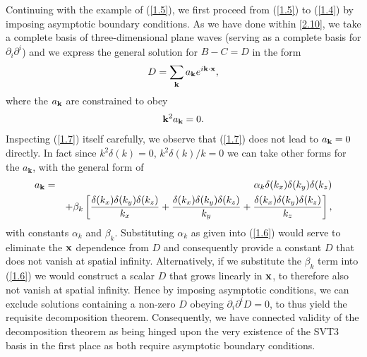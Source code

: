 Continuing with the example of (\ref{1.5}), we first proceed from (\ref{1.5}) to (\ref{1.4}) by imposing asymptotic boundary conditions. As we have done within \eqref{2.10}, we take a complete basis of three-dimensional plane waves (serving as a complete basis for $\partial_i\partial^i$) and we express the general solution for $B-C=D$ in the form
%
\begin{eqnarray}
D=\sum _{\bf k}a_{\bf k}e^{i\textbf{k}\cdot \textbf{x}},
\label{1.6}
\end{eqnarray}
%
where the $a_{\bf k}$ are constrained to obey 
%
\begin{eqnarray}
{\bf k}^2a_{\bf k}=0.
\label{1.7}
\end{eqnarray}
%
Inspecting (\ref{1.7}) itself carefully, we observe that (\ref{1.7}) does not lead to $a_{\bf k}=0$ directly. In fact since $k^2\delta(k)=0$, $k^2\delta(k)/k=0$ we can take other forms for the $a_{\mathbf k}$, with the general form of
%
\begin{eqnarray}
a_{\bf k}&=&\alpha_k\delta(k_x)\delta(k_y)\delta(k_z)
\nonumber\\
&&+\beta_k\left[\frac{\delta (k_x)\delta (k_y)\delta (k_z)}{k_x}+\frac{\delta (k_x)\delta (k_y)\delta (k_z)}{k_y}+\frac{\delta (k_x)\delta (k_y)\delta (k_z)}{k_z}\right],
\label{1.8}
\end{eqnarray}
%
with constants $\alpha_k$ and $\beta_k$. Substituting $\alpha_k$ as given into (\ref{1.6}) would serve to eliminate the ${\bf x}$ dependence from $D$ and consequently provide a constant $D$ that does not vanish at spatial infinity. Alternatively, if we substitute the $\beta_k$ term  into (\ref{1.6}) we would construct a scalar $D$ that grows linearly in ${\bf x}$, to therefore also not vanish at spatial infinity. Hence by imposing asymptotic conditions, we can exclude solutions containing a non-zero $D$ obeying $\partial_i\partial^iD=0$, to thus yield the requisite decomposition theorem. Consequently, we have connected validity of the decomposition theorem as being hinged upon the very existence of the SVT3 basis in the first place as both require asymptotic boundary conditions.

